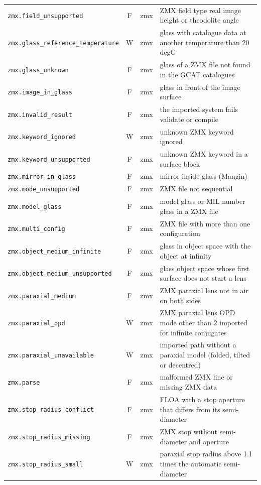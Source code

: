 \documentclass[11pt,a4paper,openany]{book}
\begin{document}
{\begin{longtable}{@{}L{6.1cm}cL{1.3cm}L{6.9cm}@{}}
\texttt{zmx.field\_unsupported} & F & zmx & ZMX field type real image height or theodolite angle \\
\texttt{zmx.glass\_reference\_temperature} & W & zmx & glass with catalogue data at another temperature than 20 degC \\
\texttt{zmx.glass\_unknown} & F & zmx & glass of a ZMX file not found in the GCAT catalogues \\
\texttt{zmx.image\_in\_glass} & F & zmx & glass in front of the image surface \\
\texttt{zmx.invalid\_result} & F & zmx & the imported system fails validate or compile \\
\texttt{zmx.keyword\_ignored} & W & zmx & unknown ZMX keyword ignored \\
\texttt{zmx.keyword\_unsupported} & F & zmx & unknown ZMX keyword in a surface block \\
\texttt{zmx.mirror\_in\_glass} & F & zmx & mirror inside glass (Mangin) \\
\texttt{zmx.mode\_unsupported} & F & zmx & ZMX file not sequential \\
\texttt{zmx.model\_glass} & F & zmx & model glass or MIL number glass in a ZMX file \\
\texttt{zmx.multi\_config} & F & zmx & ZMX file with more than one configuration \\
\texttt{zmx.object\_medium\_infinite} & F & zmx & glass in object space with the object at infinity \\
\texttt{zmx.object\_medium\_unsupported} & F & zmx & glass object space whose first surface does not start a lens \\
\texttt{zmx.paraxial\_medium} & F & zmx & ZMX paraxial lens not in air on both sides \\
\texttt{zmx.paraxial\_opd} & W & zmx & ZMX paraxial lens OPD mode other than 2 imported for infinite conjugates \\
\texttt{zmx.paraxial\_unavailable} & W & zmx & imported path without a paraxial model (folded, tilted or decentred) \\
\texttt{zmx.parse} & F & zmx & malformed ZMX line or missing ZMX data \\
\texttt{zmx.stop\_radius\_conflict} & F & zmx & FLOA with a stop aperture that differs from its semi-diameter \\
\texttt{zmx.stop\_radius\_missing} & F & zmx & ZMX stop without semi-diameter and aperture \\
\texttt{zmx.stop\_radius\_small} & W & zmx & paraxial stop radius above 1.1 times the automatic semi-diameter \\

\end{longtable}}
\end{document}
